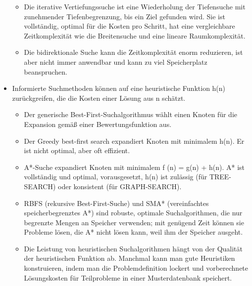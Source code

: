 \begin{itemize}
\begin{itemize}
        \item Die iterative Vertiefungssuche ist eine Wiederholung der Tiefensuche mit zunehmender Tiefenbegrenzung, bis ein Ziel gefunden wird. Sie ist vollständig, optimal für die Kosten pro Schritt, hat eine vergleichbare Zeitkomplexität wie die Breitensuche und eine lineare Raumkomplexität.
        \item Die bidirektionale Suche kann die Zeitkomplexität enorm reduzieren, ist aber nicht immer anwendbar und kann zu viel Speicherplatz beanspruchen.
    \end{itemize}
    \item Informierte Suchmethoden können auf eine heuristische Funktion h(n) zurückgreifen, die die Kosten einer Lösung aus n schätzt.
    \begin{itemize}
        \item Der generische Best-First-Suchalgorithmus wählt einen Knoten für die Expansion gemäß einer Bewertungsfunktion aus.
        \item Der Greedy best-first search expandiert Knoten mit minimalem h(n). Er ist nicht optimal, aber oft effizient.
        \item A*-Suche expandiert Knoten mit minimalem f (n) = g(n) + h(n). A* ist vollständig und optimal, vorausgesetzt, h(n) ist zulässig (für TREE-SEARCH) oder konsistent (für GRAPH-SEARCH).
        \item RBFS (rekursive Best-First-Suche) und SMA* (vereinfachtes speicherbegrenztes A*) sind robuste, optimale Suchalgorithmen, die nur begrenzte Mengen an Speicher verwenden; mit genügend Zeit können sie Probleme lösen, die A* nicht lösen kann, weil ihm der Speicher ausgeht.
        \item Die Leistung von heuristischen Suchalgorithmen hängt von der Qualität der heuristischen Funktion ab. Manchmal kann man gute Heuristiken konstruieren, indem man die Problemdefinition lockert und vorberechnete Lösungskosten für Teilprobleme in einer Musterdatenbank speichert.
    \end{itemize}
\end{itemize}
\cite{Russell:10}